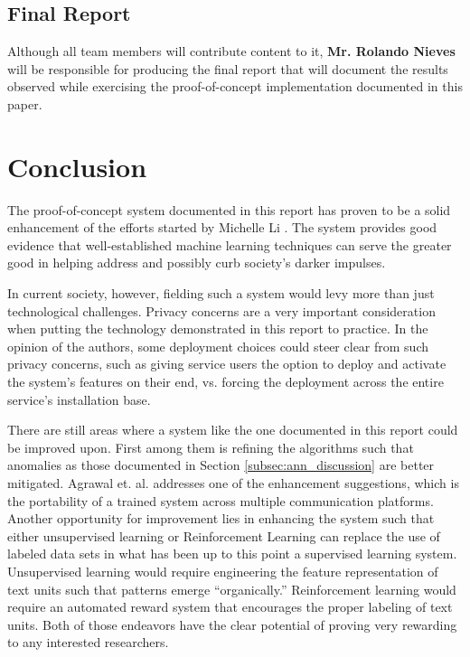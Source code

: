 \documentclass[conference]{sig-alternate-05-2015}
\begin{document}
\subsection{Final Report}\label{sec:report_task}
Although all team members will contribute content to it,
\textbf{Mr. Rolando Nieves} will be responsible for producing the final report
that will document the results observed while exercising the proof-of-concept
implementation documented in this paper.

\section{Conclusion}\label{sec:conclusion}

The proof-of-concept system documented in this report has proven to be a solid
enhancement of the efforts started by Michelle Li \cite{Li2016}. The system
provides good evidence that well-established machine learning techniques can
serve the greater good in helping address and possibly curb society's darker
impulses.

In current society, however, fielding such a system would levy more than just
technological challenges. Privacy concerns are a very important consideration
when putting the technology demonstrated in this report to practice. In the
opinion of the authors, some deployment choices could steer clear from such
privacy concerns, such as giving service users the option to deploy and activate
the system's features on their end, vs. forcing the deployment across the
entire service's installation base.

There are still areas where a system like the one documented in this report
could be improved upon. First among them is refining the algorithms such that
anomalies as those documented in Section \ref{subsec:ann_discussion} are better
mitigated. Agrawal et. al. \cite{agrawal2018deep} addresses one of the
enhancement suggestions, which is the portability of a trained system across
multiple communication platforms. Another opportunity for improvement lies in
enhancing the system such that either unsupervised learning or Reinforcement
Learning can replace the use of labeled data sets in what has been up to this
point a supervised learning system. Unsupervised learning would require
engineering the feature representation of text units such that patterns emerge
``organically.'' Reinforcement learning would require an automated reward system
that encourages the proper labeling of text units. Both of those endeavors have
the clear potential of proving very rewarding to any interested researchers.



\end{document}
